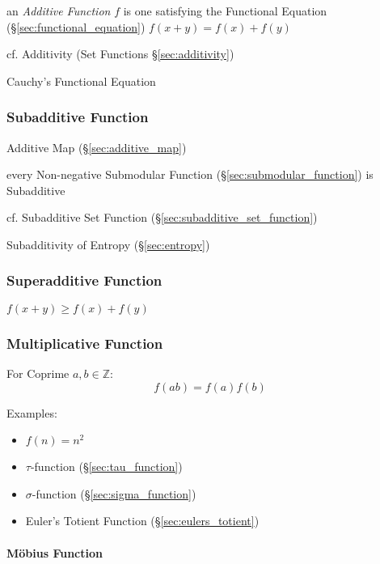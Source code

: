 an \emph{Additive Function} $f$ is one satisfying the Functional Equation
(\S\ref{sec:functional_equation}) $f(x+y) = f(x) + f(y)$

cf. Additivity (Set Functions \S\ref{sec:additivity})

Cauchy's Functional Equation



\subsubsection{Subadditive Function}\label{sec:subadditive_function}

Additive Map (\S\ref{sec:additive_map})

every Non-negative Submodular Function (\S\ref{sec:submodular_function}) is
Subadditive

cf. Subadditive Set Function (\S\ref{sec:subadditive_set_function})

Subadditivity of Entropy (\S\ref{sec:entropy})



\subsubsection{Superadditive Function}\label{sec:superadditive_function}

$f(x + y) \geq f(x) + f(y)$



\subsubsection{Multiplicative Function}\label{sec:multiplicative_function}

For Coprime $a,b \in \mathbb{Z}$:
\[
  f(ab) = f(a)f(b)
\]

Examples:
\begin{itemize}
  \item $f(n) = n^2$
  \item $\tau$-function (\S\ref{sec:tau_function})
  \item $\sigma$-function (\S\ref{sec:sigma_function})
  \item Euler's Totient Function (\S\ref{sec:eulers_totient})
\end{itemize}



\paragraph{M\"obius Function}\label{sec:mobius_function}\hfill

